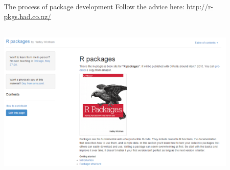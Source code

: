 \documentclass[serif]{beamer}\usepackage[]{graphicx}\usepackage[]{color}
\begin{document}
\begin{frame}{The process of package development}
Follow the advice here: \href{http://r-pkgs.had.co.nz/}{http://r-pkgs.had.co.nz/}\\~\\
\centerline{\includegraphics[width = 0.9\textwidth]{fig/hadley_book.png}}
\end{frame}
\end{document}
